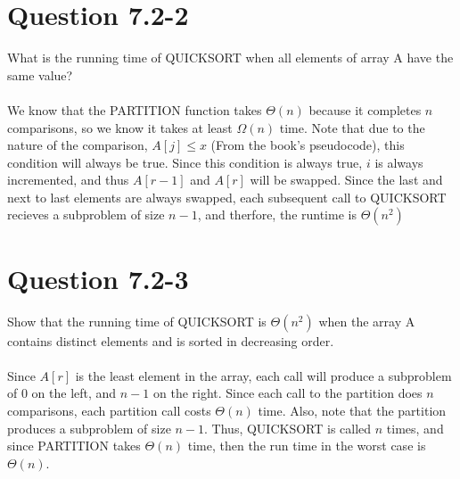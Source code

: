 \documentclass[20pt]{article} %
\begin{document}
\newpage
\section{Question 7.2-2}
What is the running time of QUICKSORT when all elements of array A have the same value? \\ \\

We know that the PARTITION function takes $\Theta(n)$ because it completes $n$ comparisons, so we know it takes at least $\Omega(n)$ time. Note that due to the nature of the comparison, $A[j] \leq x$ (From the book's pseudocode), this condition will always be true.  Since this condition is always true, $i$ is always incremented, and thus $A[r-1]$ and $A[r]$ will be swapped.  Since the last and next to last elements are always swapped, each subsequent call to QUICKSORT recieves a subproblem of size $n-1$, and therfore, the runtime is $\Theta(n^{2})$


\section{Question 7.2-3}
Show that the running time of QUICKSORT is $\Theta(n^{2})$ when the array A contains distinct elements and is sorted in decreasing order. \\ \\

Since $A[r]$ is the least element in the array, each call will produce a subproblem of $0$ on the left, and $n-1$ on the right. Since each call to the partition does $n$ comparisons, each partition call costs $\Theta(n)$ time. Also, note that the partition produces a subproblem of size $n-1$.  Thus, QUICKSORT is called $n$ times, and since PARTITION takes $\Theta(n)$ time, then the run time in the worst case is $\Theta(n)$.
\end{document}
